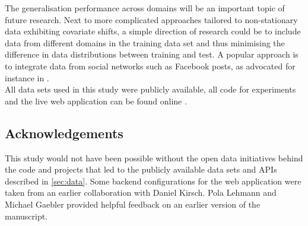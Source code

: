 \documentclass[runningheads,a4paper]{llncs}
\begin{document}
The generalisation performance across domains will be an important topic of future research. Next to more complicated approaches tailored to non-stationary data exhibiting covariate shifts, a simple direction of research could be to include data from different domains in the training data set and thus minimising the difference in data distributions between training and test.  A popular approach is to integrate data from social networks such as Facebook posts, as advocated for instance in \cite{Arzheimer2016}. \\

All data sets used in this study were publicly available, all code for experiments and the live web application can be found online \cite{fipi, fipidemo}.

\subsection*{Acknowledgements}
This study would not have been possible without the open data initiatives behind the code and projects that led to the publicly available data sets and APIs described in \autoref{sec:data}. Some backend configurations for the web application were taken from an earlier collaboration with Daniel Kirsch. Pola Lehmann and Michael Gaebler provided helpful feedback on an earlier version of the manuscript.
%
\small{

 
}
\end{document}
